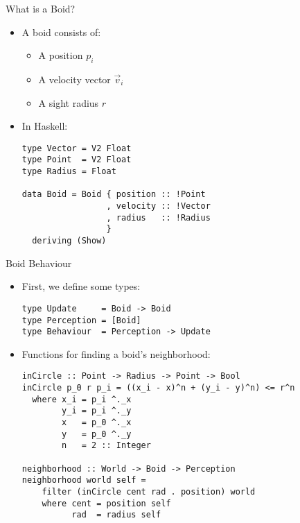 \documentclass{beamer}
\begin{document}
\begin{frame}[fragile]
    \huge{What is a Boid?}\normalsize
    \begin{itemize}
        \item A boid consists of:
        \begin{itemize}
            \item A position $p_i$
            \item A velocity vector $\vec{v}_i$
            \item A sight radius $r$
        \end{itemize}
        \item<2-> In Haskell:
        \begin{verbatim}
type Vector = V2 Float
type Point  = V2 Float
type Radius = Float

data Boid = Boid { position :: !Point
                 , velocity :: !Vector
                 , radius   :: !Radius
                 }
  deriving (Show)
        \end{verbatim}
    \end{itemize}
\end{frame}

\begin{frame}[fragile]
    \huge{Boid Behaviour}\normalsize
    \begin{itemize}
        \item First, we define some types:
        \begin{verbatim}
type Update     = Boid -> Boid
type Perception = [Boid]
type Behaviour  = Perception -> Update
        \end{verbatim}
        \item<2-> Functions for finding a boid's neighborhood:
        \begin{verbatim}
inCircle :: Point -> Radius -> Point -> Bool
inCircle p_0 r p_i = ((x_i - x)^n + (y_i - y)^n) <= r^n
  where x_i = p_i ^._x
        y_i = p_i ^._y
        x   = p_0 ^._x
        y   = p_0 ^._y
        n   = 2 :: Integer

neighborhood :: World -> Boid -> Perception
neighborhood world self =
    filter (inCircle cent rad . position) world
    where cent = position self
          rad  = radius self
    \end{verbatim}
    \end{itemize}
\end{frame}
\end{document}

